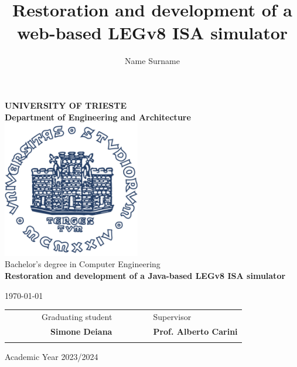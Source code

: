 \title{Restoration and development of a web-based LEGv8 ISA simulator}
\author{Name Surname}

\begin{titlepage}
    \begin{center}
    \BgThispage
    {\LARGE {\bfseries UNIVERSITY OF TRIESTE \\}}
    \vspace{.5cm}
    {\Large {\bfseries Department of Engineering and Architecture \\}}
    \vspace{1cm}
    \includegraphics[width=6cm,height=6cm]{img/units_logo.pdf}\\[1.5cm]

    {\LARGE
        Bachelor's degree in Computer Engineering \\
    }
    \vspace{1cm}
    {\LARGE 
        {\bfseries Restoration and development of a Java-based LEGv8 ISA simulator}
    }
    \vspace{1cm}

    {\large \today \\
    }

    \vfill
    \begin{table}[h]
        {\large
            \begin{tabular}{c c c c r c c | c c l}
                & & & & Graduating student & & & & & Supervisor \\
                & & & & \bfseries Simone Deiana & & & & & \bfseries Prof. Alberto Carini \\ %
                & & & & & & & & & \\
            \end{tabular}
        }
    \end{table}
    Academic Year 2023/2024
    \end{center}
\end{titlepage}
